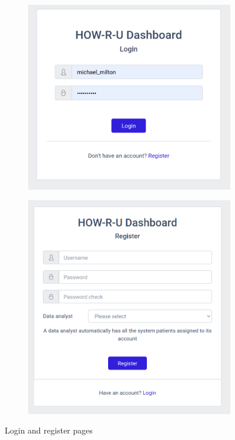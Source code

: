 \documentclass[12pt,english]{article}
\begin{document}
\begin{figure}[H]
  \begin{subfigure}[t]{0.4\textwidth}
    \centering
    \includegraphics[width=\textwidth]{login.png}
  \end{subfigure}
  \hspace{3cm}
  \begin{subfigure}[t]{0.4\textwidth}
    \centering
    \includegraphics[width=\textwidth]{register.png}
  \end{subfigure}
  \caption{Login and register pages}
\end{figure}
\end{document}
